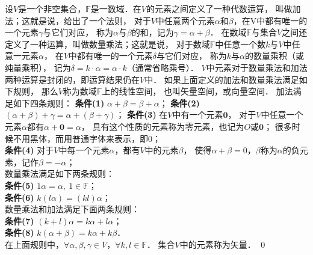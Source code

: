 \begin{definition} \label{chmla:def_linear-space}
    设$V$是一个非空集合，$\mathbb{F}$是一数域．在$V$的元素之间定义了一种代数运算，
    叫做{\heiti 加法}；这就是说，给出了一个法则，
    对于$V$中任意两个元素$\alpha$和$\beta$，在V中都有唯一的一个元素$\gamma$与它们对应，
    称为$\alpha$与$\beta$的{\heiti 和}，记为$\gamma=\alpha+\beta$．
    在数域$\mathbb{F}$与集合$V$之间还定义了一种运算，叫做{\heiti 数量乘法}；这就是说，
    对于数域$\mathbb{F}$中任意一个数$k$与$V$中任意一元素$\alpha$，
    在$V$中都有唯一的一个元素$\delta$与它们对应，
    称为$k$与$\alpha$的{\heiti 数量乘积}（或纯量乘积），
    记为$\delta=k\cdot \alpha=\alpha\cdot k$（通常省略乘号）．
    $V$中元素对于数量乘法和加法两种运算是{\heiti 封闭的}，即运算结果仍在$V$中．
    如果上面定义的加法和数量乘法满足如下规则，
    那么$V$称为数域$\mathbb{F}$上的{\heiti 线性空间}，
    也叫{\heiti 矢量空间}，或向量空间．  \newline  
    加法满足如下四条规则：\newline
    {\heiti\bfseries 条件(1)} \quad $\alpha + \beta = \beta +\alpha$；\newline
    {\heiti\bfseries 条件(2)} \quad $(\alpha + \beta) + \gamma = \alpha+ (\beta + \gamma)$；    \newline
    {\heiti\bfseries 条件(3)} \quad 在$V$中有一个元素$\boldsymbol{0}$，
    对于$V$中任意一个元素$\alpha$都有$\alpha + \boldsymbol{0} = \alpha$，
    具有这个性质的元素称为{\heiti 零元素}，也记为$O$或$\boldsymbol{0}$；
    很多时候不用黑体，而用普通字体来表示，即$0$； \\
    {\heiti\bfseries 条件(4)} \quad 对于$V$中每一个元素$\alpha$，都有$V$中的元素$\beta$，
    使得$\alpha + \beta = 0$，$\beta$称为$\alpha$的{\heiti 负元素}，记作$\beta = -\alpha$；  \\
    数量乘法满足如下两条规则：\\
    {\heiti\bfseries 条件(5)} \quad $1 \alpha =\alpha, \ 1\in \mathbb{F}$； \\
    {\heiti\bfseries 条件(6)} \quad $k(l\alpha) = (kl) \alpha$；\\
    数量乘法和加法满足下面两条规则：\\
    {\heiti\bfseries 条件(7)} \quad $(k+l)\alpha = k\alpha +l\alpha$； \\
    {\heiti\bfseries 条件(8)} \quad $k(\alpha+\beta) = k\alpha +k\beta$．  \\
    在上面规则中，$\forall \alpha,\beta,\gamma \in V$，$\forall k,l\in \mathbb{F}$．
    集合$V$中的元素称为{\heiti 矢量}．  \qed
\end{definition}


